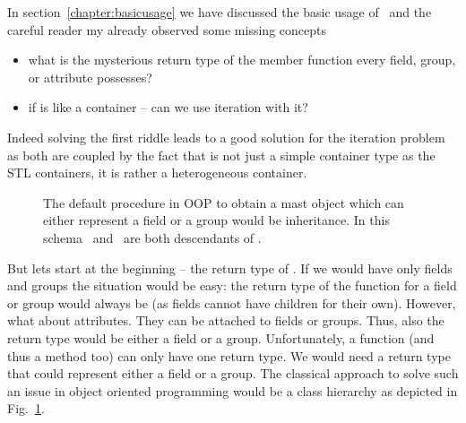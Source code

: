 
In section~\ref{chapter:basicusage} we have discussed the basic usage of
\libpniio\ and the careful reader my already observed some missing concepts
\begin{itemize}
\item what is the mysterious return type of the  member function
every field, group, or attribute possesses?
\item if  is like a container -- can we use iteration with it?
\end{itemize}
Indeed solving the first riddle leads to a good solution for the iteration
problem as both are coupled by the fact that  is not just a simple
container type as the STL containers, it is rather a heterogeneous container. 

\begin{figure}
    \centering
    \caption{{\small\label{fig:advanced:hierarchy}
    The default procedure in OOP to obtain a mast object which can either represent a
    field or a group would be inheritance. In this schema \nxfield\ and
    \nxgroup\ are both descendants of \nxobject. 
    }}
\end{figure}

But lets start at the beginning -- the return type of . If we
would have only fields and groups the situation would be easy: the return type
of the  function for a field or group would always be
 (as fields cannot have children for their own). 
However, what about attributes. They can be attached to fields or groups. Thus,
also the return type would be either a field or a group. Unfortunately, a
function (and thus a method too) can only have one return type. We would need a
return type that could represent either a field or a group. 
The classical approach to solve such an issue in object oriented programming
would be a class hierarchy as depicted in Fig.~\ref{fig:advanced:hierarchy}.

